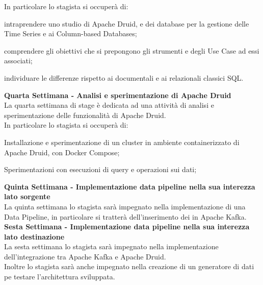 In particolare lo stagista si occuperà di:
\begin{list}{*}{}
    \item intraprendere uno studio di Apache Druid, e dei database per la gestione delle Time Series e ai Column-based
    Databases;
    \item comprendere gli obiettivi che si prepongono gli strumenti e degli Use Case ad essi associati;
    \item individuare le differenze rispetto ai documentali e ai relazionali classici SQL.
\end{list}

\noindent \textbf{Quarta Settimana - Analisi e sperimentazione di Apache Druid}\\
La quarta settimana di stage è dedicata ad una attività di analisi e sperimentazione delle funzionalità di Apache Druid. \\
In particolare lo stagista si occuperà di:
\begin{list}{*}{}
    \item Installazione e sperimentazione di un cluster in ambiente containerizzato di Apache Druid, con Docker Compose;
    \item Sperimentazioni con esecuzioni di query e operazioni sui dati;
\end{list}

\noindent  \textbf{Quinta Settimana - Implementazione data pipeline nella sua interezza lato sorgente}\\
La quinta settimana lo stagista sarà impegnato  nella implementazione di una \gls{Data Pipeline}{}, in particolare si tratterà 
dell'inserimento dei in Apache Kafka. \\

\noindent  \textbf{Sesta Settimana - Implementazione data pipeline nella sua interezza lato destinazione}\\
La sesta settimana lo stagista sarà impegnato nella implementazione dell'integrazione tra Apache Kafka e Apache Druid. \\
Inoltre lo stagista sarà anche impegnato nella creazione di un generatore di dati pe testare l'architettura sviluppata. \\

